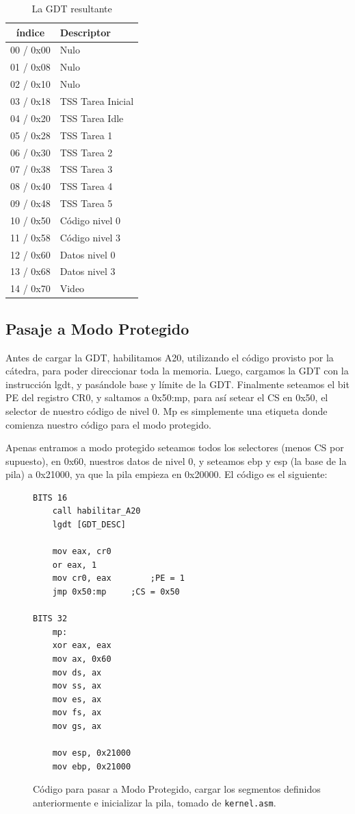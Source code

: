 \documentclass[10pt, a4paper]{article}
\begin{document}
\begin{table}[H]
\centering
    \begin{tabular}{|c|l|}
        \hline
        índice & Descriptor \\ \hline
        00 / 0x00 & Nulo \\ 
        01 / 0x08 & Nulo \\
        02 / 0x10 & Nulo \\ 
        03 / 0x18 & TSS Tarea Inicial \\ 
        04 / 0x20 & TSS Tarea Idle \\ 
        05 / 0x28 & TSS Tarea 1 \\ 
        06 / 0x30 & TSS Tarea 2 \\ 
        07 / 0x38 & TSS Tarea 3  \\ 
        08 / 0x40 & TSS Tarea 4 \\ 
        09 / 0x48 & TSS Tarea 5 \\ 
        10 / 0x50 & Código nivel 0 \\ 
        11 / 0x58 & Código nivel 3 \\ 
        12 / 0x60 & Datos nivel 0 \\ 
        13 / 0x68 & Datos nivel 3 \\ 
        14 / 0x70 & Video\\ 
        \hline
    \end{tabular}
    \caption{La GDT resultante}
\end{table}
\subsection{Pasaje a Modo Protegido}		
Antes de cargar la GDT, habilitamos A20, utilizando el código provisto por la cátedra, para poder direccionar toda la memoria. Luego, cargamos la GDT con la instrucción lgdt, y pasándole base y límite de la GDT. Finalmente seteamos el bit PE del registro CR0, y saltamos a 0x50:mp, para así setear el CS en 0x50, el selector de nuestro código de nivel 0. Mp es simplemente una etiqueta donde comienza nuestro código para el modo protegido.

Apenas entramos a modo protegido seteamos todos los selectores (menos CS por supuesto), en 0x60, nuestros datos de nivel 0, y seteamos ebp y esp (la base de la pila) a 0x21000, ya que la pila empieza en 0x20000. El código es el siguiente:
\begin{figure}[!h]
\begin{center}
\begin{verbatim}
BITS 16
	call habilitar_A20
	lgdt [GDT_DESC]
	
	mov eax, cr0
	or eax, 1		
	mov cr0, eax		;PE = 1
	jmp 0x50:mp		;CS = 0x50
		
BITS 32
    mp:
	xor eax, eax
	mov ax, 0x60
	mov ds, ax
	mov ss, ax
	mov es, ax
	mov fs, ax
	mov gs, ax
		
	mov esp, 0x21000 
	mov ebp, 0x21000 
\end{verbatim}
\caption{Código para pasar a Modo Protegido, cargar los segmentos definidos anteriormente e inicializar la pila, tomado de \texttt{kernel.asm}.}
\end{center}
\end{figure}
\newpage
\end{document}
